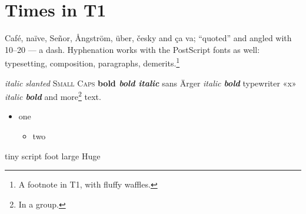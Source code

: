 \documentclass[11pt]{report}
\begin{document}
\chapter{Times in T1}
Café, naïve, Señor, Ångström, \"{u}ber, \v{c}esky and \c{c}a va; ``quoted'' and \guillemotleft angled\guillemotright{} with 10--20 --- a dash. Hyphenation works with the PostScript fonts as well: typesetting, composition, paragraphs, demerits.\footnote{A footnote in T1, with fluffy waffles.}

{\itshape italic} {\slshape slanted} {\scshape Small Caps} {\bfseries bold \itshape bold italic}
{\sffamily sans Ärger \itshape italic \bfseries bold} {\ttfamily typewriter «x» \itshape italic \bfseries bold} and {\small more\footnote{In a group.}} text.

\begin{itemize}
\item one
  \begin{itemize}
  \item two
  \end{itemize}
\end{itemize}
{\tiny tiny} {\scriptsize script} {\footnotesize foot} {\large large} {\Huge Huge}
\end{document}
